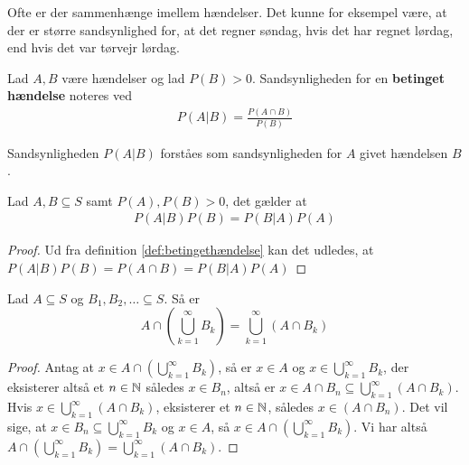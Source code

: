 Ofte er der sammenhænge imellem hændelser. Det kunne for eksempel være, at der er større sandsynlighed for, at det regner søndag, hvis det har regnet lørdag, end hvis det var tørvejr lørdag.
\begin{defn}\label{def:betingethændelse} %
Lad $A, B$ være hændelser og lad $P(B)>0$. Sandsynligheden for en \textbf{betinget hændelse} noteres ved
\begin{align*}
    P(A|B)=\frac{P(A\cap B)}{P(B)}
\end{align*}
\end{defn}
Sandsynligheden $P(A|B)$ forståes som sandsynligheden for $A$ givet hændelsen $B$.

 
\begin{thm}\label{thm:bayesTheorem} %
Lad $A, B \subseteq S$ samt $P(A), P(B) > 0$, det gælder at
\begin{align*}
    P(A|B)P(B)=P(B|A)P(A)
\end{align*}
\end{thm}
\begin{proof}
Ud fra definition \ref{def:betingethændelse} kan det udledes, at $P(A|B)P(B)=P(A\cap B)=P(B|A)P(A)$
\end{proof}

\begin{lem}  \label{lem:DistributiveLawForInfiniteUnions}
Lad $A \subseteq S$ og $B_1, B_2, \ldots \subseteq S$. Så er 
\begin{equation*}
    A \cap \left( \bigcup^\infty_{k = 1} B_k \right) = \bigcup^\infty_{k = 1} (A \cap B_k)
\end{equation*}
\end{lem}
\begin{proof}
Antag at $x \in A \cap \left( \bigcup^\infty_{k = 1} B_k\right)$, så er $x \in A$ og $x \in \bigcup^\infty_{k = 1} B_k$, der eksisterer altså et $n \in \mathbb{N}$ således $x \in B_n$, altså er $x \in A \cap B_n \subseteq \bigcup^\infty_{k = 1} (A \cap B_k)$. 
Hvis $x \in \bigcup^\infty_{k = 1} (A \cap B_k)$, eksisterer et $n \in \mathbb{N}$, således $x \in (A \cap B_n)$. Det vil sige, at $x \in B_n \subseteq \bigcup^\infty_{k = 1} B_k$ og $x \in A$, så $x \in A \cap \left( \bigcup^\infty_{k = 1} B_k \right)$. Vi har altså $A \cap \left( \bigcup^\infty_{k = 1} B_k \right) = \bigcup^\infty_{k = 1} (A \cap B_k)$.
\end{proof}

